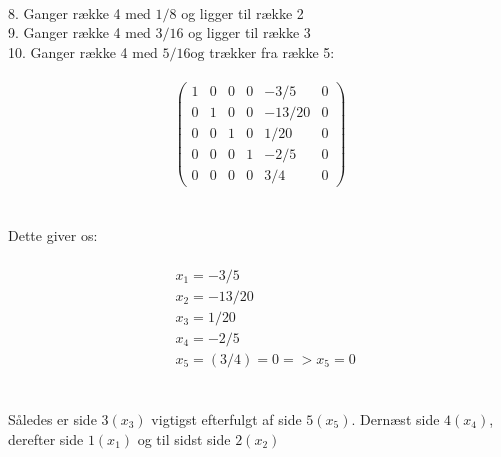 \documentclass{article}
\begin{document}
\\
8. Ganger række 4 med $1 / 8$ og ligger til række 2
\\
9. Ganger række 4 med $3 / 16$ og ligger til række 3
\\
10. Ganger række 4 med $5 / 16 \mathrm{og}$ trækker fra række 5:
\\
\\
$$\left(\begin{array}{rrrrr|r}1 & 0 & 0 & 0 & -3 / 5 & 0 \\ 0 & 1 & 0 & 0 & -13 / 20 & 0 \\ 0 & 0 & 1 & 0 & 1 / 20 & 0 \\ 0 & 0 & 0 & 1 & -2 / 5 & 0 \\ 0 & 0 & 0 & 0 & 3 / 4 & 0\end{array}\right)$$
\\
\\
Dette giver os:
\\
\\
$$\begin{aligned} & x_1=-3 / 5 \\ & x_2=-13 / 20 \\ & x_3=1 / 20 \\ & x_4=-2 / 5 \\ & x_5=(3 / 4)=0=>x_5=0\end{aligned}$$
\\
\\
Således er side $3\left(x_3\right)$ vigtigst efterfulgt af side $5\left(x_5\right)$. Dernæst side $4\left(x_4\right)$, derefter side $1\left(x_1\right)$ og til sidst side $2\left(x_2\right)$
\end{document}
